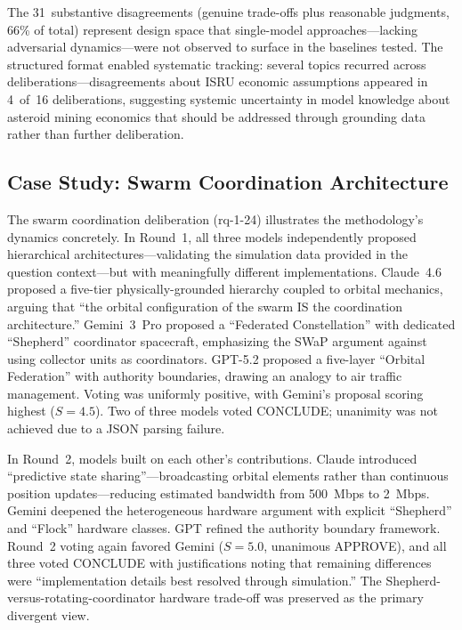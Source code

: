 \documentclass[11pt,a4paper]{article}
\begin{document}
The 31~substantive disagreements (genuine trade-offs plus reasonable judgments, 66\% of total) represent design space that single-model approaches---lacking adversarial dynamics---were not observed to surface in the baselines tested. The structured format enabled systematic tracking: several topics recurred across deliberations---disagreements about ISRU economic assumptions appeared in 4~of~16 deliberations, suggesting systemic uncertainty in model knowledge about asteroid mining economics that should be addressed through grounding data rather than further deliberation.

\subsection{Case Study: Swarm Coordination Architecture}

The swarm coordination deliberation (rq-1-24) illustrates the methodology's dynamics concretely. In Round~1, all three models independently proposed hierarchical architectures---validating the simulation data provided in the question context---but with meaningfully different implementations. Claude~4.6 proposed a five-tier physically-grounded hierarchy coupled to orbital mechanics, arguing that ``the orbital configuration of the swarm IS the coordination architecture.'' Gemini~3~Pro proposed a ``Federated Constellation'' with dedicated ``Shepherd'' coordinator spacecraft, emphasizing the SWaP argument against using collector units as coordinators. GPT-5.2 proposed a five-layer ``Orbital Federation'' with authority boundaries, drawing an analogy to air traffic management. Voting was uniformly positive, with Gemini's proposal scoring highest ($S = 4.5$). Two of three models voted CONCLUDE; unanimity was not achieved due to a JSON parsing failure.

In Round~2, models built on each other's contributions. Claude introduced ``predictive state sharing''---broadcasting orbital elements rather than continuous position updates---reducing estimated bandwidth from 500~Mbps to 2~Mbps. Gemini deepened the heterogeneous hardware argument with explicit ``Shepherd'' and ``Flock'' hardware classes. GPT refined the authority boundary framework. Round~2 voting again favored Gemini ($S = 5.0$, unanimous APPROVE), and all three voted CONCLUDE with justifications noting that remaining differences were ``implementation details best resolved through simulation.'' The Shepherd-versus-rotating-coordinator hardware trade-off was preserved as the primary divergent view.
\end{document}
